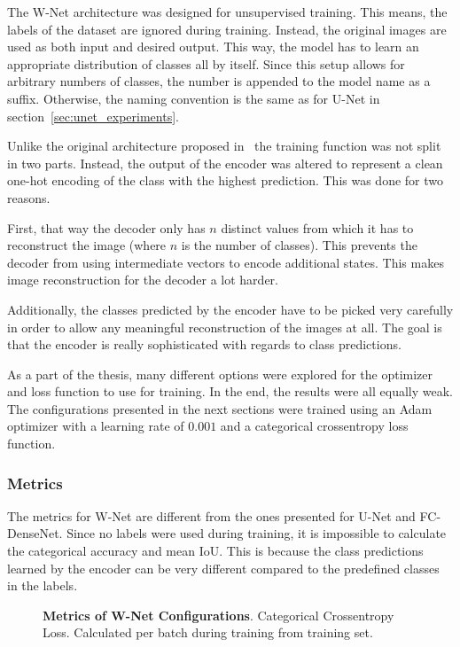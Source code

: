The W-Net architecture was designed for unsupervised training. This means, the labels of the dataset are ignored during training. Instead, the original images are used as both input and desired output. This way, the model has to learn an appropriate distribution of classes all by itself. Since this setup allows for arbitrary numbers of classes, the number is appended to the model name as a suffix. Otherwise, the naming convention is the same as for U-Net in section~\ref{sec:unet_experiments}.

Unlike the original architecture proposed in~\cite{wnet17} the training function was not split in two parts. Instead, the output of the encoder was altered to represent a clean one-hot encoding of the class with the highest prediction. This was done for two reasons.

First, that way the decoder only has $n$ distinct values from which it has to reconstruct the image (where $n$ is the number of classes). This prevents the decoder from using intermediate vectors to encode additional states. This makes image reconstruction for the decoder a lot harder.

Additionally, the classes predicted by the encoder have to be picked very carefully in order to allow any meaningful reconstruction of the images at all. The goal is that the encoder is really sophisticated with regards to class predictions.

As a part of the thesis, many different options were explored for the optimizer and loss function to use for training. In the end, the results were all equally weak. The configurations presented in the next sections were trained using an Adam optimizer with a learning rate of $0.001$ and a categorical crossentropy loss function.

\subsubsection{Metrics}
The metrics for W-Net are different from the ones presented for U-Net and FC-DenseNet. Since no labels were used during training, it is impossible to calculate the categorical accuracy and mean IoU. This is because the class predictions learned by the encoder can be very different compared to the predefined classes in the labels.

\begin{figure}[h]
    \centering
            
    \caption[Metrics of W-Net Configurations]
    {\textbf{Metrics of W-Net Configurations}. Categorical Crossentropy Loss. Calculated per batch during training from training set.}
    \label{fig:wnet_train_metrics}
\end{figure}

